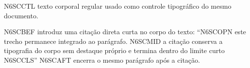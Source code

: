 \documentclass{abntexto-ufc}
\begin{document}
\textual

\noindent N6SCCTL texto corporal regular usado como controle tipográfico do mesmo documento.

\noindent N6SCBEF introduz uma citação direta curta no corpo do texto: \enquote{N6SCOPN este trecho permanece integrado ao parágrafo. N6SCMID a citação conserva a tipografia do corpo sem destaque próprio e termina dentro do limite curto N6SCCLS} N6SCAFT encerra o mesmo parágrafo após a citação.
\end{document}
